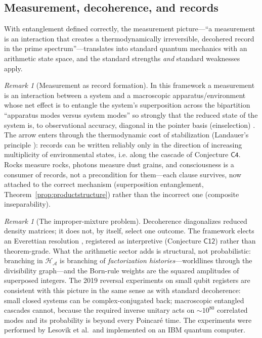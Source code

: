 \documentclass[11pt,a4paper]{article}
\theoremstyle{plain}
\theoremstyle{definition}
\theoremstyle{remark}
\newtheorem{remark}[theorem]{Remark}
\newcommand{\Hil}{\mathcal{H}}
\begin{document}
\subsection{Measurement, decoherence, and records}

With entanglement defined correctly, the measurement picture---``a measurement is an
interaction that creates a thermodynamically irreversible, decohered record in the prime
spectrum''---translates into standard quantum mechanics with an arithmetic
state space, and the standard strengths \emph{and} standard weaknesses apply.

\begin{remark}[Measurement as record formation]
In this framework a measurement is an interaction between a system and a
macroscopic apparatus/environment whose net effect is to entangle the system's
superposition across the bipartition ``apparatus modes versus system modes'' so strongly
that the reduced state of the system is, to observational accuracy, diagonal in the
pointer basis (einselection) \cite{zurek2003}. The arrow enters through the thermodynamic
cost of stabilization (Landauer's principle \cite{landauer1961}): records can be written
reliably only in the direction of increasing multiplicity of environmental states, i.e. along
the cascade of Conjecture $\mathsf{C4}$. Rocks measure rocks, photons measure dust grains,
and consciousness is a consumer of records, not a precondition for them---each clause
survives, now attached to the correct mechanism (superposition
entanglement, Theorem~\ref{prop:productstructure}) rather than the incorrect one
(composite inseparability).
\end{remark}

\begin{remark}[The improper-mixture problem]
Decoherence diagonalizes reduced density matrices; it does not, by itself, select one
outcome. The framework elects an Everettian resolution
\cite{wallace2012}, registered as interpretive
(Conjecture $\mathsf{C12}$) rather than theorem-grade. What the arithmetic sector adds is
structural, not probabilistic: branching in $\Hil_{\mathcal{A}}$ is branching of
\emph{factorization histories}---worldlines through the divisibility graph---and the
Born-rule weights are the squared amplitudes of superposed integers. The 2019 reversal
experiments on small qubit registers \cite{lesovik2019} are consistent with this picture in
the same sense as with standard decoherence: small closed systems can be
complex-conjugated back; macroscopic entangled cascades cannot, because the required
inverse unitary acts on $\sim10^{80}$ correlated modes and its probability is beyond every
Poincar\'e time. The experiments were performed by Lesovik et al.\ and implemented on an IBM
quantum computer.
\end{remark}
\end{document}
